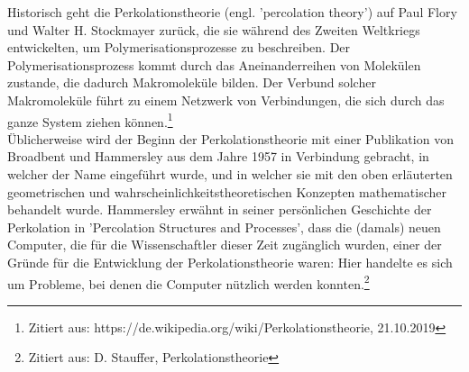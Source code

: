 \documentclass[a4paper, 12pt]{scrartcl}
\begin{document}
\noindent Historisch geht die Perkolationstheorie (engl. 'percolation theory') auf Paul Flory und Walter H. Stockmayer zurück, die sie während des Zweiten Weltkriegs entwickelten, um Polymerisationsprozesse zu beschreiben. Der Polymerisationsprozess kommt durch das Aneinanderreihen von Molekülen zustande, die dadurch Makromoleküle bilden. Der Verbund solcher Makromoleküle führt zu einem Netzwerk von Verbindungen, die sich durch das ganze System ziehen können.\footnote[1]{Zitiert aus: https://de.wikipedia.org/wiki/Perkolationstheorie, 21.10.2019}
\\
\noindent Üblicherweise wird der Beginn der Perkolationstheorie mit einer Publikation von Broadbent  und Hammersley aus dem Jahre 1957 in Verbindung gebracht, in welcher der Name eingeführt wurde, und in welcher sie mit den oben erläuterten geometrischen und wahrscheinlichkeitstheoretischen Konzepten mathematischer behandelt wurde. Hammersley erwähnt in seiner persönlichen Geschichte der Perkolation in 'Percolation Structures and Processes', dass die (damals) neuen Computer, die für die Wissenschaftler dieser Zeit zugänglich wurden, einer der Gründe für die Entwicklung der Perkolationstheorie waren: Hier handelte es sich um Probleme, bei denen die Computer nützlich werden konnten.\footnote[2]{Zitiert aus: D. Stauffer, Perkolationstheorie}
\end{document}
